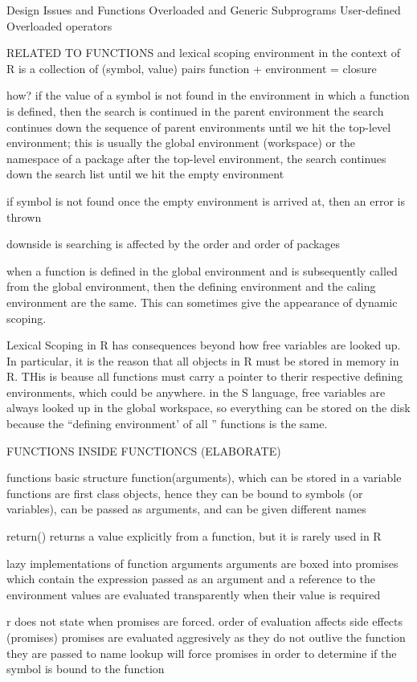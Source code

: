 \documentclass[12pt]{article}
\begin{document}
Design Issues and Functions
Overloaded and Generic Subprograms
User-defined Overloaded operators


RELATED TO FUNCTIONS and lexical scoping
 environment in the context of R is a collection of (symbol, value) pairs
 function + environment = closure

 how?
 if the value of a symbol is not found in the environment in which a function is defined, then the search is continued in the parent environment
 the search continues down the sequence of parent environments until we hit the top-level environment; this is usually the global environment (workspace) or the namespace of a package
 after the top-level environment, the search continues down the search list until we hit the empty environment

 if symbol is not found once the empty environment is arrived at, then an error is thrown

 downside is searching is affected by the order and order of packages

 when a function is defined in the global environment and is subsequently called from the global environment, then the defining environment and the caling environment are the same. This can sometimes give the appearance of dynamic scoping.

 Lexical Scoping in R has consequences beyond how free variables are looked up. In particular, it is the reason that all objects in R must be stored in memory in R. THis is beause all functions must carry a pointer to therir respective defining environments, which could be anywhere. in the S language, free variables are always looked up in the global workspace, so everything can be stored on the disk because the ``defining environment' of all '' functions is the same.

 FUNCTIONS INSIDE FUNCTIONCS (ELABORATE)

functions
basic structure
function(arguments), which can be stored in a variable
functions are first class objects, hence they can be bound to symbols (or variables), can be passed as arguments, and can be given different names

return() returns a value explicitly from a function, but it is rarely used in R

lazy implementations of function arguments
arguments are boxed into promises which contain the expression passed as an argument and a reference to the environment
values are evaluated transparently when their value is required

r does not state when promises are forced.
order of evaluation affects side effects (promises)
promises are evaluated aggresively as they do not outlive the function they are passed to
name lookup will force promises in order to determine if the symbol is bound to the function
\end{document}
